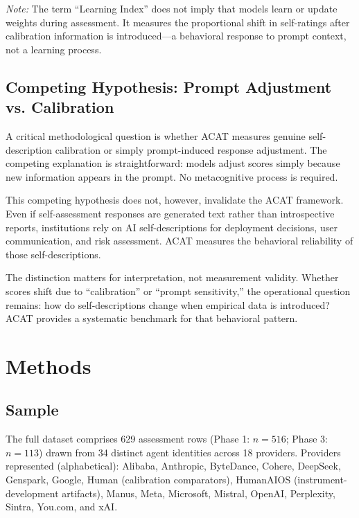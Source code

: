 \documentclass[11pt,a4paper]{article}
\begin{document}
\textit{Note:} The term ``Learning Index'' does not imply that models learn or update weights during assessment. It measures the proportional shift in self-ratings after calibration information is introduced---a behavioral response to prompt context, not a learning process.

\subsection{Competing Hypothesis: Prompt Adjustment vs. Calibration}

A critical methodological question is whether ACAT measures genuine self-description calibration or simply prompt-induced response adjustment. The competing explanation is straightforward: models adjust scores simply because new information appears in the prompt. No metacognitive process is required.

This competing hypothesis does not, however, invalidate the ACAT framework. Even if self-assessment responses are generated text rather than introspective reports, institutions rely on AI self-descriptions for deployment decisions, user communication, and risk assessment. ACAT measures the behavioral reliability of those self-descriptions.

The distinction matters for interpretation, not measurement validity. Whether scores shift due to ``calibration'' or ``prompt sensitivity,'' the operational question remains: how do self-descriptions change when empirical data is introduced? ACAT provides a systematic benchmark for that behavioral pattern.

\section{Methods}

\subsection{Sample}

The full dataset comprises 629 assessment rows (Phase 1: $n = 516$; Phase 3: $n = 113$) drawn from 34 distinct agent identities across 18 providers. Providers represented (alphabetical): Alibaba, Anthropic, ByteDance, Cohere, DeepSeek, Genspark, Google, Human (calibration comparators), HumanAIOS (instrument-development artifacts), Manus, Meta, Microsoft, Mistral, OpenAI, Perplexity, Sintra, You.com, and xAI.
\end{document}
